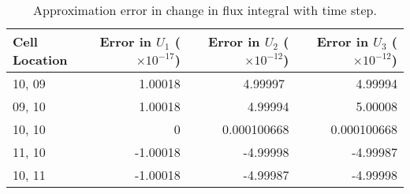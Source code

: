\begin{table}
\begin{center}
\begin{tabular}{|l | r | r | r |}
\hline

Cell Location & Error in $U_1$ ($\times 10^{-17}$) & Error in $U_2$ ($\times 10^{-12}$) & Error  in $U_3$ ($\times 10^{-12}$) \\

\hline
10, 09 & 1.00018  & 4.99997 $$ & 4.99994  \\
09, 10 & 1.00018  & 4.99994  & 5.00008 \\
10, 10 & 0 & 0.000100668 & 0.000100668 \\
11, 10 & -1.00018 & -4.99998 & -4.99987 \\
10, 11 & -1.00018 & -4.99987 & -4.99998 \\
\hline
\end{tabular}
\caption{Approximation error in change in flux integral with time step.}
\label{jacobian}
\end{center}
\end{table}
